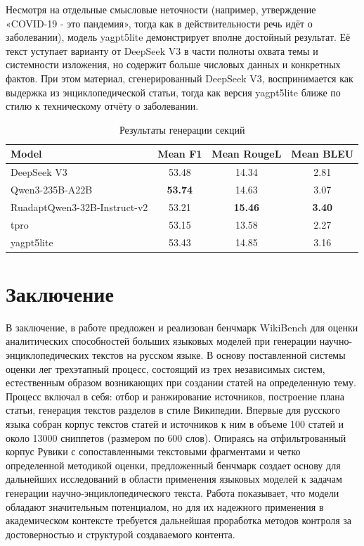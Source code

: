 \documentclass{article}
\theoremstyle{definition}
\theoremstyle{plain}
\begin{document}
Несмотря на отдельные смысловые неточности (например, утверждение «COVID-19 - это пандемия», тогда как в действительности речь идёт о заболевании), 
модель yagpt5lite демонстрирует вполне достойный результат. Её текст уступает варианту от DeepSeek V3 в части полноты охвата темы и системности изложения, 
но содержит больше числовых данных и конкретных фактов. При этом материал, сгенерированный DeepSeek V3, воспринимается как выдержка из энциклопедической статьи, 
тогда как версия yagpt5lite ближе по стилю к техническому отчёту о заболевании.

\begin{table}[ht!]
\centering
\caption{Результаты генерации секций}
\begin{tabular}{l|c|c|c}
\hline
\textbf{Model} & \textbf{Mean F1} & \textbf{Mean RougeL} & \textbf{Mean BLEU}\\
\hline
DeepSeek V3                  & 53.48 & 14.34 & 2.81\\
Qwen3-235B-A22B              & \textbf{53.74} & 14.63 & 3.07\\
RuadaptQwen3-32B-Instruct-v2 & 53.21 & \textbf{15.46} & \textbf{3.40}\\
tpro                         & 53.15 & 13.58 & 2.27\\
yagpt5lite                   & 53.43 & 14.85 & 3.16\\
\hline
\end{tabular}
\label{tab:secs}
\end{table}

\FloatBarrier
\section*{Заключение}
В заключение, в работе предложен и реализован бенчмарк WikiBench для оценки аналитических способностей больших языковых моделей при генерации научно-энциклопедических текстов на русском языке.
В основу поставленной системы оценки лег трехэтапный процесс, состоящий из трех независимых систем, естественным образом возникающих при создании статей на определенную тему.
Процесс включал в себя: отбор и ранжирование источников, построение плана статьи, генерация текстов разделов в стиле Википедии.
Впервые для русского языка собран корпус текстов статей и источников к ним в объеме 100 статей и около 13000 сниппетов (размером по 600 слов). Опираясь на отфильтрованный корпус Рувики с сопоставленными текстовыми фрагментами и четко определенной методикой оценки, 
предложенный бенчмарк создает основу для дальнейших исследований в области применения языковых моделей к задачам генерации научно-энциклопедического текста. Работа показывает, что модели обладают значительным потенциалом, 
но для их надежного применения в академическом контексте требуется дальнейшая проработка методов контроля за достоверностью и структурой создаваемого контента.
\end{document}
